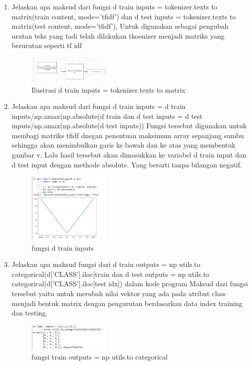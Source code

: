 \begin{enumerate}
	\item Jelaskan apa maksud dari fungsi d train inputs = tokenizer.texts to matrix(train content, mode=’tﬁdf’) dan d test inputs = tokenizer.texts to matrix(test content, mode=’tﬁdf’), 
	\hfill\break
	Untuk digunakan sebagai pengubah urutan teks yang tadi telah dilakukan tkoenizer menjadi matriks yang berurutan seperti tf idf
	\begin{figure}[H]
	    \centering
	    \includegraphics[width=4cm]{figures/1174077/7/teori_6.PNG}
	    \caption{Ilustrasi d train inputs = tokenizer.texts to matrix}
    \end{figure}

    \item  Jelaskan apa maksud dari fungsi d train inputs = d train inputs/np.amax(np.absolute(d train dan d test inputs = d test inputs/np.amax(np.absolute(d test inputs))
    \hfill\break
    Fungsi tersebut digunakan untuk membagi matriks tfidf dnegan penentuan maksimum array sepanjang sumbu sehingga akan menimbulkan garis ke bawah dan ke atas yang membentuk gambar v. Lalu hasil tersebut akan dimasukkan ke variabel d train input dan d test input dengan methode absolute. Yang berarti tanpa bilangan negatif.
    \begin{figure}[H]
	    \centering
	    \includegraphics[width=4cm]{figures/1174077/7/teori_7.PNG}
	    \caption{fungsi d train inputs}
    \end{figure}

    \item Jelaskan apa maksud fungsi dari d train outputs = np utils.to categorical(d[’CLASS’].iloc[train dan d test outputs = np utils.to categorical(d[’CLASS’].iloc[test idx]) dalam kode program
    \hfill\break
    Maksud dari fungsi tersebut yaitu untuk merubah nilai vektor yang ada pada atribut class menjadi bentuk matrix dengan pengurutan berdasarkan data index training dan testing.
    \begin{figure}[H]
	    \centering
	    \includegraphics[width=4cm]{figures/1174077/7/teori_8.PNG}
	    \caption{fungsi train outputs = np utils.to categorical}
    \end{figure}


\end{enumerate}

